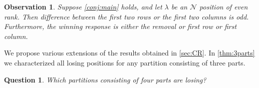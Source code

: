 \documentclass[pdflatex,sn-mathphys-num]{sn-jnl}%
\theoremstyle{thmstyleone}%
\theoremstyle{thmstyletwo}%
\theoremstyle{thmstylethree}%
\newtheorem{question}{Question}
\newtheorem{obs}{Observation}
\newcommand{\p}{\mathcal P}
\newcommand{\n}{\mathcal N}
\begin{document}
\begin{table}[ht]
\centering
{}
\vspace{3mm}
\caption{How much do \cref{thm:oddsareeven,cor:evensareodd,thm:almost-hook,thm:thick-hook,lem:rectangle,prop:hooksquare,thm:3parts,thm:2parts} explain? The first row represents $n$, the size of the partition. The second row is the number $p(n)$ of partitions of size $n$. The third row is the fraction $u(n)$ of partitions of size $n$ whose $\p/\n$-status is not explained by our results. The fourth row is the fraction $c(n)$ of partitions of size $n$ whose $\p/\n$-status is explained by our results, assuming \cref{conj:main} holds.
}
\label{tab:data}
\end{table}

\vspace{-13mm}

\begin{obs}
Suppose \cref{conj:main} holds, and let $\lambda$ be an $\n$ position of even rank. 
Then difference between the first two rows or the first two columns is odd.
Furthermore, the winning response is either the removal or first row or first column.
\end{obs}
We propose various extensions of the results obtained in \cref{sec:CR}. 
%
In \cref{thm:3parts} we characterized all losing positions for any partition consisting of three parts.
\begin{question}
    Which partitions consisting of four parts are losing?
\end{question}
\end{document}
